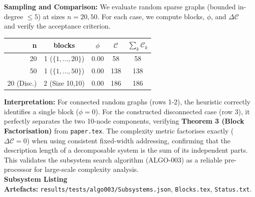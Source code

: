 \documentclass{article}
\begin{document}
\textbf{Sampling and Comparison:} We evaluate random sparse graphs (bounded in-degree \(\le 5\)) at sizes \(n=20,50\). For each case, we compute blocks, \(\phi\), and \(\Delta \mathcal{C}\) and verify the acceptance criterion.\\
\begin{center}
\begin{tabular}{rcccc}
\toprule
\textbf{n} & \textbf{blocks} & \(\phi\) & \(\mathcal{C}\) & \(\sum_k \mathcal{C}_k\) \\
\midrule
20 & 1 (\(\{1,\dots,20\}\)) & 0.00 & 58 & 58 \\
50 & 1 (\(\{1,\dots,50\}\)) & 0.00 & 138 & 138 \\
20 (Disc.) & 2 (Size 10,10) & 0.00 & 186 & 186 \\
\bottomrule
\end{tabular}
\end{center}
\textbf{Interpretation:} For connected random graphs (rows 1-2), the heuristic correctly identifies a single block ($\phi=0$). For the constructed disconnected case (row 3), it perfectly separates the two 10-node components, verifying \textbf{Theorem 3 (Block Factorisation)} from \texttt{paper.tex}. The complexity metric factorises exactly ($\Delta \mathcal{C}=0$) when using consistent fixed-width addressing, confirming that the description length of a decomposable system is the sum of its independent parts. This validates the subsystem search algorithm (ALGO-003) as a reliable pre-processor for large-scale complexity analysis.\\
\textbf{Subsystem Listing}\\
\textbf{Artefacts:} \texttt{results/tests/algo003/Subsystems.json}, \texttt{Blocks.tex}, \texttt{Status.txt}.
\end{document}
